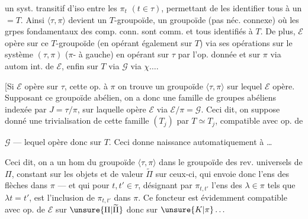 un syst. transitif d'iso entre les $\pi_t$ $(t\in\tau)$, permettant de les identifier tous à un $=T$. Ainsi $\langle\tau,\pi\rangle$ devient un $T$-groupoïde,  un groupoïde (pas néc. connexe) où les grpes fondamentaux des comp. conn. sont comm. et tous identifiés à $T$.
De plus, $\mathcal E$ opère sur ce $T$-groupoïde (en opérant également sur $T$) via ses opérations sur le système $(\tau,\pi)$ ($\pi$- à gauche) en opérant sur $\tau$ par l'op. donnée et sur $\pi$ via autom int. de $\mathcal E$, enfin sur $T$ via $\mathcal G$ via $\chi\ldots.$

[Si $\mathcal E$ opère sur $\tau$,  cette op. à $\pi$ on trouve un groupoïde $\langle\tau,\pi\rangle$ sur lequel $\mathcal E$ opère. Supposant ce groupoïde abélien, on a donc une famille de groupes abéliens  indexée par $J=\tau/\pi$, sur laquelle opère $\mathcal E$ via $\mathcal E/\pi=\mathcal G$. Ceci dit, on suppose donné une trivialisation de cette famille $(T_j)$ par $T\simeq T_j$, compatible avec op. de

$\mathcal G$ --- lequel opère donc sur $T$. Ceci donne naissance automatiquement à
\ldots

Ceci dit, on a un hom du groupoïde $\langle\tau,\pi\rangle$ dans le groupoïde des rev. universels de $\Pi$, constant sur les objets et de valeur $\widetilde\Pi$ sur ceux-ci, qui envoie donc l'ens des flèches dans $\pi$ --- et qui pour $t,t'\in\tau$, désignant par $\pi_{t,t'}$  l'ens des $\lambda\in\pi$ tels que $\lambda t=t'$, est l'inclusion de $\pi_{t,t'}$ dans $\pi$. Ce foncteur
est évidemment compatible avec op. de $\mathcal E$ sur $\unsure{\Pi|\widetilde\Pi}$ donc sur $\unsure{K|\pi}\ldots$

